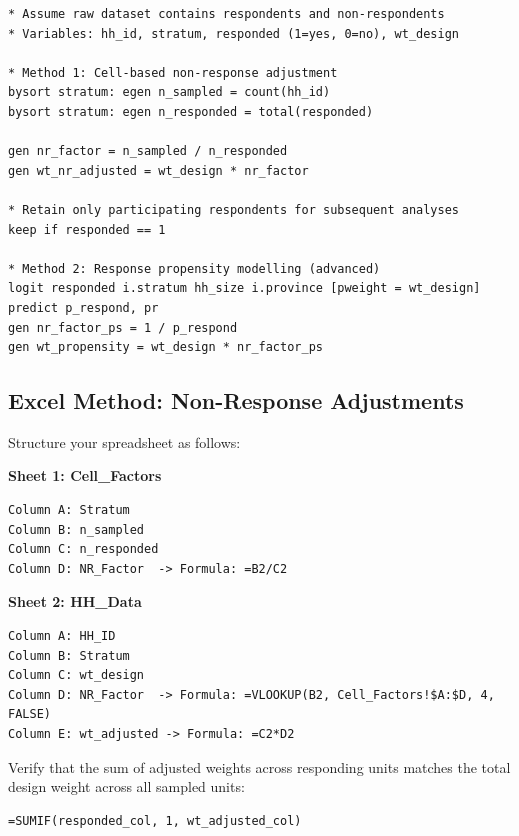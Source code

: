 \documentclass[11pt,a4paper]{article}
\begin{document}
\begin{lstlisting}[style=stata, caption={Non-Response Adjustments in Stata}]
* Assume raw dataset contains respondents and non-respondents
* Variables: hh_id, stratum, responded (1=yes, 0=no), wt_design

* Method 1: Cell-based non-response adjustment
bysort stratum: egen n_sampled = count(hh_id)
bysort stratum: egen n_responded = total(responded)

gen nr_factor = n_sampled / n_responded
gen wt_nr_adjusted = wt_design * nr_factor

* Retain only participating respondents for subsequent analyses
keep if responded == 1

* Method 2: Response propensity modelling (advanced)
logit responded i.stratum hh_size i.province [pweight = wt_design]
predict p_respond, pr
gen nr_factor_ps = 1 / p_respond
gen wt_propensity = wt_design * nr_factor_ps
\end{lstlisting}

\newpage

\subsection{Excel Method: Non-Response Adjustments}
Structure your spreadsheet as follows:

\textbf{Sheet 1: Cell\_Factors}
\begin{lstlisting}[style=excel, caption={Excel Formulas for Non-Response Cells}]
Column A: Stratum
Column B: n_sampled
Column C: n_responded
Column D: NR_Factor  -> Formula: =B2/C2
\end{lstlisting}

\textbf{Sheet 2: HH\_Data}
\begin{lstlisting}[style=excel, caption={VLOOKUP implementation in HH\_Data}]
Column A: HH_ID
Column B: Stratum
Column C: wt_design
Column D: NR_Factor  -> Formula: =VLOOKUP(B2, Cell_Factors!$A:$D, 4, FALSE)
Column E: wt_adjusted -> Formula: =C2*D2
\end{lstlisting}

Verify that the sum of adjusted weights across responding units matches the total design weight across all sampled units:
\begin{lstlisting}[style=excel]
=SUMIF(responded_col, 1, wt_adjusted_col)
\end{lstlisting}
\end{document}
